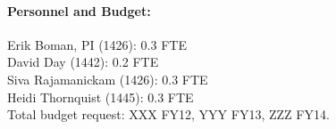 \documentclass[10pt]{amsart}
\begin{document}
\paragraph{\bf Personnel and Budget:}
Erik Boman, PI (1426): 0.3 FTE\\
David Day (1442): 0.2 FTE\\
Siva Rajamanickam (1426): 0.3 FTE\\
Heidi Thornquist (1445): 0.3 FTE\\

Total budget request: XXX FY12, YYY FY13, ZZZ FY14.
\end{document}
